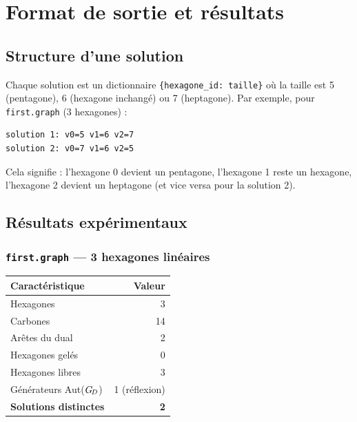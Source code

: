 \section{Format de sortie et résultats}

\subsection{Structure d'une solution}

Chaque solution est un dictionnaire \texttt{\{hexagone\_id: taille\}} où la taille est 5
(pentagone), 6 (hexagone inchangé) ou 7 (heptagone). Par exemple, pour \texttt{first.graph}
(3 hexagones) :

\begin{lstlisting}[style=benzai]
solution 1: v0=5 v1=6 v2=7
solution 2: v0=7 v1=6 v2=5
\end{lstlisting}

Cela signifie : l'hexagone 0 devient un pentagone, l'hexagone 1 reste un hexagone,
l'hexagone 2 devient un heptagone (et vice versa pour la solution 2).

\subsection{Résultats expérimentaux}

\subsubsection{\texttt{first.graph} — 3 hexagones linéaires}

\begin{center}
\begin{tabular}{lr}
  \toprule
  Caractéristique & Valeur \\
  \midrule
  Hexagones & 3 \\
  Carbones & 14 \\
  Arêtes du dual & 2 \\
  Hexagones gelés & 0 \\
  Hexagones libres & 3 \\
  Générateurs Aut($G_{\!D}$) & 1 (réflexion) \\
  \textbf{Solutions distinctes} & \textbf{2} \\
  \bottomrule
\end{tabular}
\end{center}

